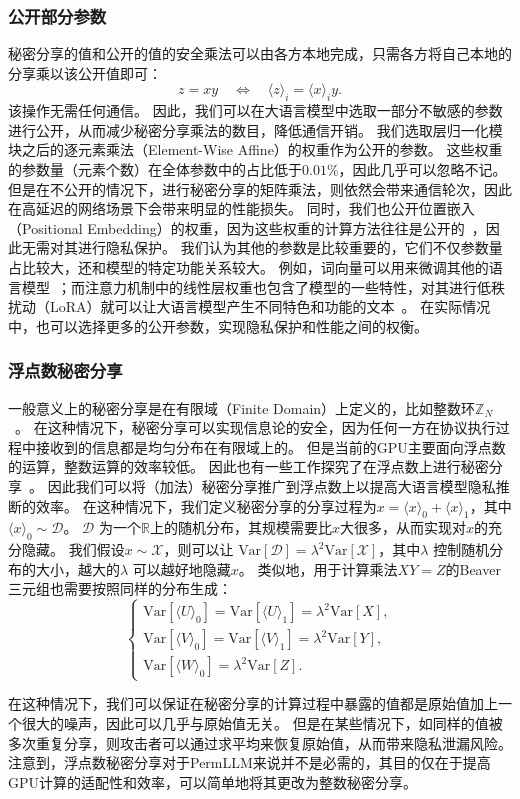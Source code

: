 \subsubsection{公开部分参数}
秘密分享的值和公开的值的安全乘法可以由各方本地完成，只需各方将自己本地的分享乘以该公开值即可：
\begin{equation}
    z = xy \quad \Leftrightarrow \quad \langle z \rangle_i = \langle x \rangle_i y.
\end{equation}
该操作无需任何通信。
%
因此，我们可以在大语言模型中选取一部分不敏感的参数进行公开，从而减少秘密分享乘法的数目，降低通信开销。
%
我们选取层归一化模块之后的逐元素乘法（Element-Wise Affine）的权重作为公开的参数。
%
这些权重的参数量（元素个数）在全体参数中的占比低于$0.01\%$，因此几乎可以忽略不记。
但是在不公开的情况下，进行秘密分享的矩阵乘法，则依然会带来通信轮次，因此在高延迟的网络场景下会带来明显的性能损失。
%
同时，我们也公开位置嵌入（Positional Embedding）的权重，因为这些权重的计算方法往往是公开的~\cite{devlin_2019_bert,sujianlin_2024_rope}，因此无需对其进行隐私保护。
%
我们认为其他的参数是比较重要的，它们不仅参数量占比较大，还和模型的特定功能关系较大。
%
例如，词向量可以用来微调其他的语言模型~\cite{yeqi_2018_word_embedding_translation,lample_2016_ner}；而注意力机制中的线性层权重也包含了模型的一些特性，对其进行低秩扰动（LoRA）就可以让大语言模型产生不同特色和功能的文本~\cite{edward_2022_lora}。
%
在实际情况中，也可以选择更多的公开参数，实现隐私保护和性能之间的权衡。

%
\subsubsection{浮点数秘密分享}
一般意义上的秘密分享是在有限域（Finite Domain）上定义的，比如整数环$\mathbb Z_N$~\cite{shamir1979share}。
在这种情况下，秘密分享可以实现信息论的安全，因为任何一方在协议执行过程中接收到的信息都是均匀分布在有限域上的。
%
但是当前的GPU主要面向浮点数的运算，整数运算的效率较低。
因此也有一些工作探究了在浮点数上进行秘密分享~\cite{tjell_2021_real_sharing,gundersen_2023_real_sharing}。
因此我们可以将（加法）秘密分享推广到浮点数上以提高大语言模型隐私推断的效率。
%
在这种情况下，我们定义秘密分享的分享过程为$x = \langle x \rangle_0 + \langle x \rangle_1$，其中 $\langle x \rangle_0 \sim \mathcal D$。
%
$\mathcal D$ 为一个$\mathbb R$上的随机分布，其规模需要比$x$大很多，从而实现对$x$的充分隐藏。
%
我们假设$x \sim \mathcal X$，则可以让 $\text{Var}[\mathcal D] = \lambda^2 \text{Var}[\mathcal X]$，其中$\lambda$ 控制随机分布的大小，越大的$\lambda$ 可以越好地隐藏$x$。
%
类似地，用于计算乘法$XY=Z$的Beaver三元组也需要按照同样的分布生成：
\begin{equation}
\begin{cases}
    \text{Var}[\langle U \rangle_0] = \text{Var}[\langle U \rangle_1] = \lambda^2 \text{Var}[X], \\
    \text{Var}[\langle V \rangle_0] = \text{Var}[\langle V \rangle_1] = \lambda^2 \text{Var}[Y], \\
    \text{Var}[\langle W \rangle_0] = \lambda^2 \text{Var}[Z].
\end{cases}
\end{equation}
%

在这种情况下，我们可以保证在秘密分享的计算过程中暴露的值都是原始值加上一个很大的噪声，因此可以几乎与原始值无关。
%
但是在某些情况下，如同样的值被多次重复分享，则攻击者可以通过求平均来恢复原始值，从而带来隐私泄漏风险。
%
注意到，浮点数秘密分享对于PermLLM来说并不是必需的，其目的仅在于提高GPU计算的适配性和效率，可以简单地将其更改为整数秘密分享。
%

